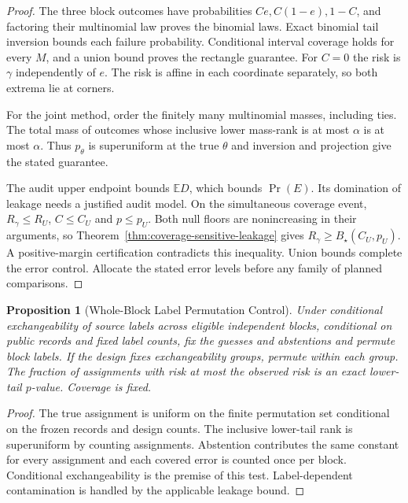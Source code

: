 \documentclass[11pt,a4paper]{article}
\newtheorem{proposition}[theorem]{Proposition}
\begin{document}
\begin{proof}
The three block outcomes have probabilities $Ce,C(1-e),1-C$, and factoring their multinomial law proves the binomial laws. Exact binomial tail inversion bounds each failure probability. Conditional interval coverage holds for every $M$, and a union bound proves the rectangle guarantee. For $C=0$ the risk is $\gamma$ independently of $e$. The risk is affine in each coordinate separately, so both extrema lie at corners.

For the joint method, order the finitely many multinomial masses, including ties. The total mass of outcomes whose inclusive lower mass-rank is at most $\alpha$ is at most $\alpha$. Thus $p_\theta$ is superuniform at the true $\theta$ and inversion and projection give the stated guarantee.

The audit upper endpoint bounds $\mathbb E D$, which bounds $\Pr(E)$. Its domination of leakage needs a justified audit model. On the simultaneous coverage event, $R_\gamma\le R_U$, $C\le C_U$ and $p\le p_U$. Both null floors are nonincreasing in their arguments, so Theorem~\ref{thm:coverage-sensitive-leakage} gives $R_\gamma\ge B_\star(C_U,p_U)$. A positive-margin certification contradicts this inequality. Union bounds complete the error control. Allocate the stated error levels before any family of planned comparisons.
\end{proof}

\begin{proposition}[Whole-Block Label Permutation Control]\label{prop:block-label-permutation}
Under conditional exchangeability of source labels across eligible independent blocks, conditional on public records and fixed label counts, fix the guesses and abstentions and permute block labels. If the design fixes exchangeability groups, permute within each group. The fraction of assignments with risk at most the observed risk is an exact lower-tail $p$-value. Coverage is fixed.
\end{proposition}
\begin{proof}
The true assignment is uniform on the finite permutation set conditional on the frozen records and design counts. The inclusive lower-tail rank is superuniform by counting assignments. Abstention contributes the same constant for every assignment and each covered error is counted once per block. Conditional exchangeability is the premise of this test. Label-dependent contamination is handled by the applicable leakage bound.
\end{proof}
\end{document}
